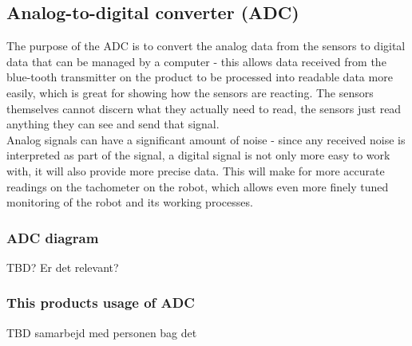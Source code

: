 \subsection{Analog-to-digital converter (ADC)}

The purpose of the ADC is to convert the analog data from the sensors to digital data that can be managed by a computer - this allows data received from the blue-tooth transmitter on the product to be processed into readable data more easily, which is great for showing how the sensors are reacting. The sensors themselves cannot discern what they actually need to read, the sensors just read anything they can see and send that signal. \\
Analog signals can have a significant amount of noise - since any received noise is interpreted as part of the signal, a digital signal is not only more easy to work with, it will also provide more precise data. This will make for more accurate readings on the tachometer on the robot, which allows even more finely tuned monitoring of the robot and its working processes. \\

\subsubsection{ADC diagram} 
TBD? Er det relevant?

\subsubsection{This products usage of ADC}

TBD samarbejd med personen bag det
